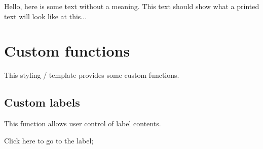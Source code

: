 \documentclass{report}
\begin{document}
	Hello,  here  is  some  text  without  a  meaning.   This  text  should
	show what a printed text will look like at this...
	
	\section{Custom functions}
	This styling / template provides some custom functions. 
	
	\subsection{Custom labels}
	This function allows user control of label contents. 
	
	
	Click here to go to the label;
	
	
	\listoffigures
	\listoftables
	
	
\end{document}
